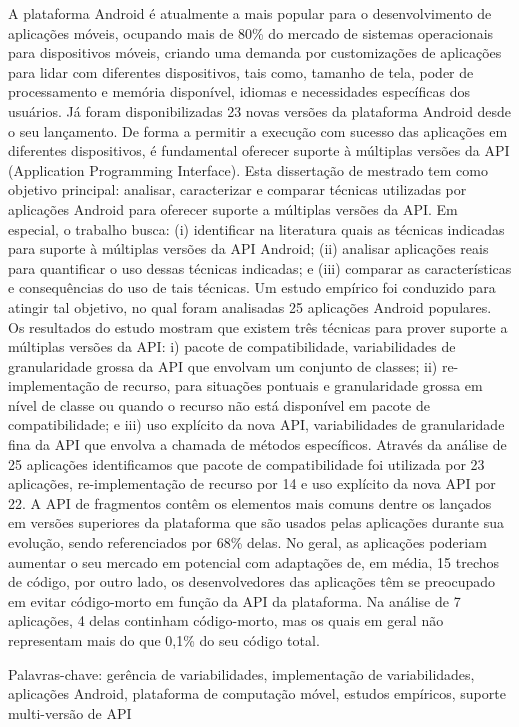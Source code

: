 \noindent A plataforma Android é atualmente a mais popular para o desenvolvimento
de aplicações móveis, ocupando mais de 80\% do mercado de sistemas operacionais para
dispositivos móveis, criando uma demanda por customizações de aplicações para lidar
com diferentes dispositivos, tais como, tamanho de tela, poder de processamento e
memória disponível, idiomas e necessidades específicas dos usuários. Já foram
disponibilizadas 23 novas versões da plataforma Android desde o seu lançamento. De
forma a permitir a execução com sucesso das aplicações em diferentes dispositivos,
é fundamental oferecer suporte à múltiplas versões da API (Application Programming
Interface). Esta dissertação de mestrado tem como objetivo principal: analisar,
caracterizar e comparar técnicas utilizadas por aplicações Android para oferecer
suporte a múltiplas versões da API. Em especial, o trabalho busca: (i) identificar
na literatura quais as técnicas indicadas para suporte à múltiplas versões da API
Android; (ii) analisar aplicações reais para quantificar o uso dessas técnicas
indicadas; e (iii) comparar as características e consequências do uso de tais
técnicas. Um estudo empírico foi conduzido para atingir tal objetivo, no qual
foram analisadas 25 aplicações Android populares. Os resultados do estudo mostram
que existem três técnicas para prover suporte a múltiplas versões da API: i) pacote
de compatibilidade, variabilidades de granularidade grossa da API que envolvam um
conjunto de classes; ii) re-implementação de recurso, para situações pontuais e
granularidade grossa em nível de classe ou quando o recurso não está disponível
em pacote de compatibilidade; e iii) uso explícito da nova API, variabilidades de
granularidade fina da API que envolva a chamada de métodos específicos. Através da
análise de 25 aplicações identificamos que pacote de compatibilidade foi utilizada
por 23 aplicações, re-implementação de recurso por 14 e uso explícito da nova API
por 22. A API de fragmentos contêm os elementos mais comuns dentre os lançados em
versões superiores da plataforma que são usados pelas aplicações durante sua evolução,
sendo referenciados por 68\% delas. No geral, as aplicações poderiam aumentar o seu
mercado em potencial com adaptações de, em média, 15 trechos de código, por outro
lado, os desenvolvedores das aplicações têm se preocupado em evitar código-morto em
função da API da plataforma. Na análise de 7 aplicações, 4 delas continham código-morto,
mas os quais em geral não representam mais do que 0,1\% do seu código total.

Palavras-chave: gerência de variabilidades, implementação de variabilidades, aplicações
Android, plataforma de computação móvel, estudos empíricos, suporte multi-versão de API